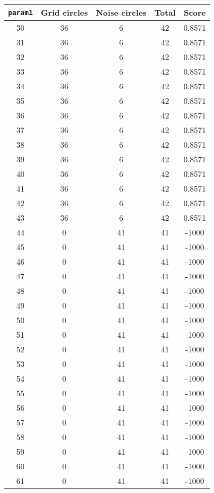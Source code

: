 \documentclass[letterpaper, 12pt]{article}
\begin{document}
\begin{longtable}{|c|c|c|c|c|}
\hline
\textbf{\texttt{param1}} & \textbf{Grid circles} & \textbf{Noise circles} & \textbf{Total} & \textbf{Score} \\
\hline
30 & 36 & 6 & 42 & 0.8571 \\
\hline
31 & 36 & 6 & 42 & 0.8571 \\
\hline
32 & 36 & 6 & 42 & 0.8571 \\
\hline
33 & 36 & 6 & 42 & 0.8571 \\
\hline
34 & 36 & 6 & 42 & 0.8571 \\
\hline
35 & 36 & 6 & 42 & 0.8571 \\
\hline
36 & 36 & 6 & 42 & 0.8571 \\
\hline
37 & 36 & 6 & 42 & 0.8571 \\
\hline
38 & 36 & 6 & 42 & 0.8571 \\
\hline
39 & 36 & 6 & 42 & 0.8571 \\
\hline
40 & 36 & 6 & 42 & 0.8571 \\
\hline
41 & 36 & 6 & 42 & 0.8571 \\
\hline
42 & 36 & 6 & 42 & 0.8571 \\
\hline
43 & 36 & 6 & 42 & 0.8571 \\
\hline
44 & 0 & 41 & 41 & -1000 \\
\hline
45 & 0 & 41 & 41 & -1000 \\
\hline
46 & 0 & 41 & 41 & -1000 \\
\hline
47 & 0 & 41 & 41 & -1000 \\
\hline
48 & 0 & 41 & 41 & -1000 \\
\hline
49 & 0 & 41 & 41 & -1000 \\
\hline
50 & 0 & 41 & 41 & -1000 \\
\hline
51 & 0 & 41 & 41 & -1000 \\
\hline
52 & 0 & 41 & 41 & -1000 \\
\hline
53 & 0 & 41 & 41 & -1000 \\
\hline
54 & 0 & 41 & 41 & -1000 \\
\hline
55 & 0 & 41 & 41 & -1000 \\
\hline
56 & 0 & 41 & 41 & -1000 \\
\hline
57 & 0 & 41 & 41 & -1000 \\
\hline
58 & 0 & 41 & 41 & -1000 \\
\hline
59 & 0 & 41 & 41 & -1000 \\
\hline
60 & 0 & 41 & 41 & -1000 \\
\hline
61 & 0 & 41 & 41 & -1000 \\

\end{longtable}
\end{document}
